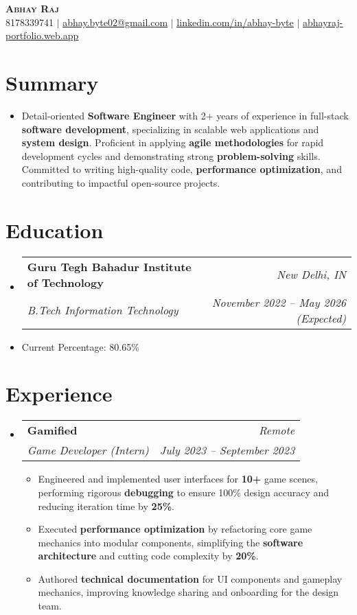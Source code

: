 \documentclass[letterpaper,11pt]{article}
\makeatletter
\newcommand{\resumeItem}[1]{
  \item\small{#1 \vspace{-2pt}}
}
\newcommand{\resumeSubheading}[4]{
  \vspace{-2pt}\item
  \begin{tabular*}{0.97\textwidth}[t]{l@{\extracolsep{\fill}}r}
    \textbf{#1} & \textit{\small #2} \\
    \textit{\small #3} & \textit{\small #4} \\
  \end{tabular*}\vspace{-7pt}
}
\newcommand{\resumeSubItem}[1]{\resumeItem{#1}\vspace{-4pt}}
\newcommand{\resumeSubHeadingListStart}{\begin{itemize}[leftmargin=0.15in, label={}]}
\newcommand{\resumeSubHeadingListEnd}{\end{itemize}}
\newcommand{\resumeItemListStart}{\begin{itemize}}
\newcommand{\resumeItemListEnd}{\end{itemize}\vspace{-5pt}}
\makeatother
\begin{document}
\begin{center}
  \textbf{\Huge \scshape Abhay Raj} \\ \vspace{1pt}
  \small 8178339741 $|$ \href{mailto:abhay.byte02@gmail.com}{\underline{abhay.byte02@gmail.com}} $|$
  \href{https://linkedin.com/in/abhay-byte}{\underline{linkedin.com/in/abhay-byte}} $|$
  \href{https://abhayraj-portfolio.web.app}{\underline{abhayraj-portfolio.web.app}}
\end{center}

\section{Summary}
\resumeSubHeadingListStart
  \resumeItem{Detail-oriented \textbf{Software Engineer} with 2+ years of experience in full-stack \textbf{software development}, specializing in scalable web applications and \textbf{system design}. Proficient in applying \textbf{agile methodologies} for rapid development cycles and demonstrating strong \textbf{problem-solving} skills. Committed to writing high-quality code, \textbf{performance optimization}, and contributing to impactful open-source projects.}
\resumeSubHeadingListEnd

\section{Education}
\resumeSubHeadingListStart
  \resumeSubheading
    {Guru Tegh Bahadur Institute of Technology}{New Delhi, IN}
    {B.Tech Information Technology}{November 2022 -- May 2026 (Expected)}
    \resumeSubItem{Current Percentage: 80.65\%}
\resumeSubHeadingListEnd

\section{Experience}
\resumeSubHeadingListStart
  \resumeSubheading
    {Gamified}{Remote}
    {Game Developer (Intern)}{July 2023 -- September 2023}
    \resumeItemListStart
      \resumeItem{Engineered and implemented user interfaces for \textbf{10+} game scenes, performing rigorous \textbf{debugging} to ensure 100\% design accuracy and reducing iteration time by \textbf{25\%}.}
      \resumeItem{Executed \textbf{performance optimization} by refactoring core game mechanics into modular components, simplifying the \textbf{software architecture} and cutting code complexity by \textbf{20\%}.}
      \resumeItem{Authored \textbf{technical documentation} for UI components and gameplay mechanics, improving knowledge sharing and onboarding for the design team.}
    \resumeItemListEnd
\resumeSubHeadingListEnd
\end{document}
